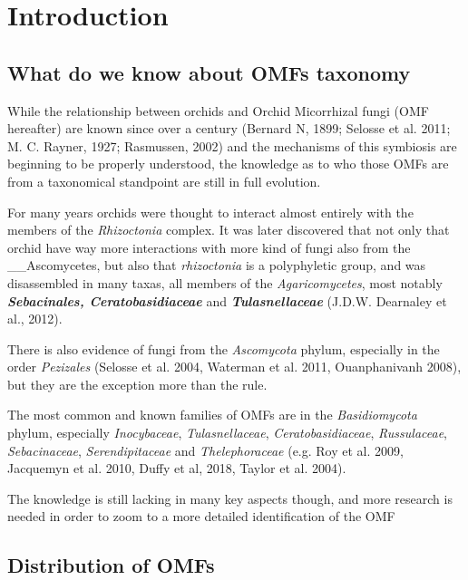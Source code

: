 

\part{Introduction}
\label{introduction}

\chapter{What do we know about OMFs taxonomy}
\label{whatdoweknowaboutomfstaxonomy}

While the relationship between orchids and Orchid Micorrhizal fungi (OMF hereafter) are known since over a century (Bernard N, 1899; Selosse et al. 2011; M. C. Rayner, 1927; Rasmussen, 2002) and the mechanisms of this symbiosis are beginning to be properly understood, the knowledge as to who those OMFs are from a taxonomical standpoint are still in full evolution.

For many years orchids were thought to interact almost entirely with the members of the \emph{Rhizoctonia} complex. It was later discovered that not only that orchid have way more interactions with more kind of fungi also from the \_\_Ascomycetes, but also that \emph{rhizoctonia} is a polyphyletic group, and was disassembled in many taxas, all members of the \emph{Agaricomycetes}, most notably \textbf{\emph{Sebacinales, Ceratobasidiaceae}} and \textbf{\emph{Tulasnellaceae}} (J.D.W. Dearnaley et al., 2012).

There is also evidence of fungi from the \emph{Ascomycota} phylum, especially in the order \emph{Pezizales} (Selosse et al. 2004, Waterman et al. 2011, Ouanphanivanh 2008), but they are the exception more than the rule.

The most common and known families of OMFs are in the \emph{Basidiomycota} phylum, especially \emph{Inocybaceae}, \emph{Tulasnellaceae}, \emph{Ceratobasidiaceae}, \emph{Russulaceae}, \emph{Sebacinaceae}, \emph{Serendipitaceae} and \emph{Thelephoraceae} (e.g. Roy et al. 2009, Jacquemyn et al. 2010, Duffy et al, 2018, Taylor et al. 2004).

The knowledge is still lacking in many key aspects though, and more research is needed in order to zoom to a more detailed identification of the OMF

\chapter{Distribution of OMFs}
\label{distributionofomfs}

